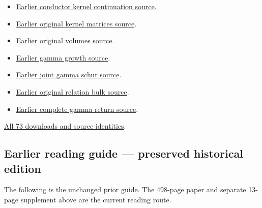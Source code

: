 \documentclass[
]{article}
\begin{document}
\begin{itemize}
{  exterior kernel continuation source}.
\item
  \href{https://github.com/KokunoYumeto/zeta-function-research-reader/tree/41adc412ceb119ad9086b1f106e377f3de2d401a/workbenches/splitzero-tandem/continuations/20260914-conductor-kernel-continuation}{Earlier
  conductor kernel continuation source}.
\item
  \href{https://github.com/KokunoYumeto/zeta-function-research-reader/tree/5817ef9027257375b6ff3de7048b3331077251e7/workbenches/splitzero-tandem/continuations/20260914-original-kernel-matrices}{Earlier
  original kernel matrices source}.
\item
  \href{https://github.com/KokunoYumeto/zeta-function-research-reader/tree/1c8ec52c85c173adc9f8403a8a26914955e2f5a9/workbenches/splitzero-tandem/continuations/20260914-original-volumes}{Earlier
  original volumes source}.
\item
  \href{https://github.com/KokunoYumeto/zeta-function-research-reader/tree/41f020e0475429943252e69a1b4edd849393c780/workbenches/splitzero-tandem/continuations/20260914-gamma-growth}{Earlier
  gamma growth source}.
\item
  \href{https://github.com/KokunoYumeto/zeta-function-research-reader/tree/2be3b23974bf040f4ea06240b8a4b85372f7c71d/workbenches/splitzero-tandem/continuations/20260914-joint-gamma-schur}{Earlier
  joint gamma schur source}.
\item
  \href{https://github.com/KokunoYumeto/zeta-function-research-reader/tree/01fc8820e3a3ea69afa22b8ab1b0b5ca61869456/workbenches/splitzero-tandem/continuations/20260914-original-relation-bulk}{Earlier
  original relation bulk source}.
\item
  \href{https://github.com/KokunoYumeto/zeta-function-research-reader/tree/01fc8820e3a3ea69afa22b8ab1b0b5ca61869456/workbenches/splitzero-tandem/continuations/20260914-complete-gamma-return}{Earlier
  complete gamma return source}.
\end{itemize}

\href{calculation_edition_20260915_native_conductor/README.md}{All 73
downloads and source identities}.

\subsection{Earlier reading guide --- preserved historical
edition}\label{earlier-reading-guide-preserved-historical-edition-1}

The following is the unchanged prior guide. The 498-page paper and
separate 13-page supplement above are the current reading route.
\end{document}
